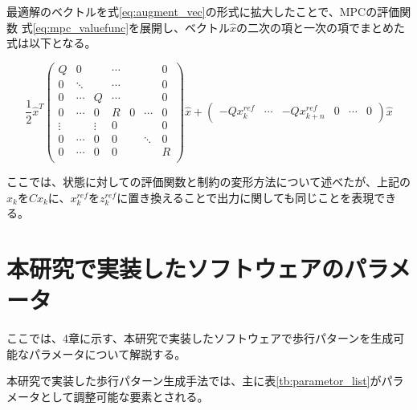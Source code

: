 最適解のベクトルを式\eqref{eq:augment_vec}の形式に拡大したことで、MPCの評価関数 式\eqref{eq:mpc_valuefunc}を展開し、ベクトル$\hat{x}$の二次の項と一次の項でまとめた式は以下となる。

\begin{equation}
  \frac{1}{2}\hat{x}^T
  \begin{pmatrix}
    Q      & 0      &        & \cdots &   &        & 0 \\
    0      & \ddots &        & \cdots &   &        & 0 \\
    0      & \cdots & Q      & \cdots &   &        & 0 \\
    0      & \cdots & 0      & R      & 0 & \cdots & 0 \\
    \vdots &        & \vdots & 0      &   &        & 0 \\
    0      & \cdots & 0      & 0      &   & \ddots & 0 \\
    0      & \cdots & 0      & 0      &   &        & R \\
  \end{pmatrix}
  \hat{x}
  +
  \begin{pmatrix}
    -Qx_{k}^{ref} & \cdots & -Qx_{k+n}^{ref} & 0 & \cdots & 0
  \end{pmatrix}
  \hat{x}
\end{equation}

ここでは、状態に対しての評価関数と制約の変形方法について述べたが、上記の$x_{k}$を$Cx_{k}$に、$x_{k}^{ref}$を$z_{k}^{ref}$に置き換えることで出力に関しても同じことを表現できる。

\section{本研究で実装したソフトウェアのパラメータ}

ここでは、4章に示す、本研究で実装したソフトウェアで歩行パターンを生成可能なパラメータについて解説する。

本研究で実装した歩行パターン生成手法では、主に表\ref{tb:parametor_list}がパラメータとして調整可能な要素とされる。

